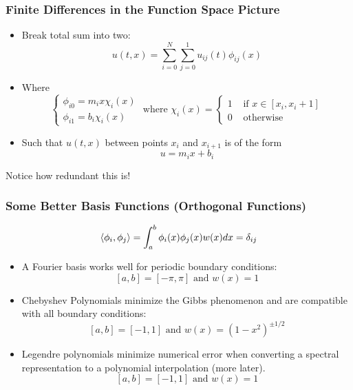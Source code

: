 \documentclass[]{beamer}
\begin{document}
\begin{frame}
  \frametitle{Finite Differences in the Function Space Picture}
  \begin{itemize}
    \item Break total sum into two:
      $$u(t,x) = \sum_{i=0}^N\sum_{j=0}^1 u_{ij}(t) \phi_{ij}(x)$$
    \item Where 
      $$\begin{cases}\phi_{i0}=m_i x\chi_i(x)\\\phi_{i1}=b_i\chi_i(x)\end{cases}\text{ where }\chi_i(x)=\begin{cases}1&\text{ if }x\in[x_i,x_i+1]\\0&\text{ otherwise}\end{cases}$$
      \item Such that $u(t,x)$ between points $x_i$ and $x_{i+1}$ is of the form
        $$u = m_ix + b_i$$
  \end{itemize}
  \pause
  \begin{Large}
    \begin{center}
      Notice how redundant this is!
    \end{center}
  \end{Large}
\end{frame}

\begin{frame}
  \frametitle{Some Better Basis Functions (Orthogonal Functions)}
  \begin{Large}$$\braket{\phi_i,\phi_j} = \int_{a}^b \phi_i(x)\phi_j(x) w(x) dx = \delta_{ij}$$\end{Large}
  \begin{itemize} 
  \item A Fourier basis works well for periodic boundary conditions:
    $$[a,b]=[-\pi,\pi]\text{ and }w(x) = 1$$
  \item Chebyshev Polynomials minimize the Gibbs phenomenon and are
    compatible with all boundary conditions:
    $$[a,b]=[-1,1]\text{ and }w(x) = (1-x^2)^{\pm 1/2}$$
  \item Legendre polynomials minimize numerical error when converting
    a spectral representation to a polynomial interpolation (more later).
    $$[a,b]=[-1,1]\text{ and }w(x) = 1$$
  \end{itemize}
\end{frame}
\end{document}
